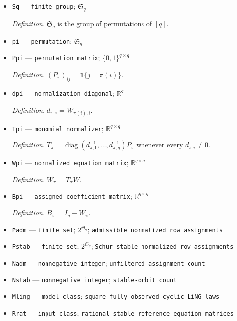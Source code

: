 \documentclass{article}
\begin{document}
\begin{itemize}
  \par\smallskip\noindent\emph{Definition.} \(\rho(M)=\max\{|\lambda|:\det(\lambda I-M)=0\}\).
  \item \texttt{Sq} --- \texttt{finite group}; \(\mathfrak S_q\)
  \par\smallskip\noindent\emph{Definition.} \(\mathfrak S_q\) is the group of permutations of \([q]\).
  \item \texttt{pi} --- \texttt{permutation}; \(\mathfrak S_q\)
  \item \texttt{Ppi} --- \texttt{permutation matrix}; \(\{0,1\}^{q\times q}\)
  \par\smallskip\noindent\emph{Definition.} \((P_\pi)_{ij}=\mathbf 1\{j=\pi(i)\}\).
  \item \texttt{dpi} --- \texttt{normalization diagonal}; \(\mathbb R^q\)
  \par\smallskip\noindent\emph{Definition.} \(d_{\pi,i}=W_{\pi(i),i}\).
  \item \texttt{Tpi} --- \texttt{monomial normalizer}; \(\mathbb R^{q\times q}\)
  \par\smallskip\noindent\emph{Definition.} \(T_\pi=\operatorname{diag}(d_{\pi,1}^{-1},\ldots,d_{\pi,q}^{-1})P_\pi\) whenever every \(d_{\pi,i}\neq0\).
  \item \texttt{Wpi} --- \texttt{normalized equation matrix}; \(\mathbb R^{q\times q}\)
  \par\smallskip\noindent\emph{Definition.} \(W_\pi=T_\pi W\).
  \item \texttt{Bpi} --- \texttt{assigned coefficient matrix}; \(\mathbb R^{q\times q}\)
  \par\smallskip\noindent\emph{Definition.} \(B_\pi=I_q-W_\pi\).
  \item \texttt{Padm} --- \texttt{finite set}; \(2^{\mathfrak S_q}\); \texttt{admissible normalized row assignments}
  \item \texttt{Pstab} --- \texttt{finite set}; \(2^{\mathfrak S_q}\); \texttt{Schur-\allowbreak{}stable normalized row assignments}
  \item \texttt{Nadm} --- \texttt{nonnegative integer}; \texttt{unfiltered assignment count}
  \item \texttt{Nstab} --- \texttt{nonnegative integer}; \texttt{stable-\allowbreak{}orbit count}
  \item \texttt{Mling} --- \texttt{model class}; \texttt{square fully observed cyclic LiNG laws}
  \item \texttt{Rrat} --- \texttt{input class}; \texttt{rational stable-\allowbreak{}reference equation matrices}

\end{itemize}
\end{document}
